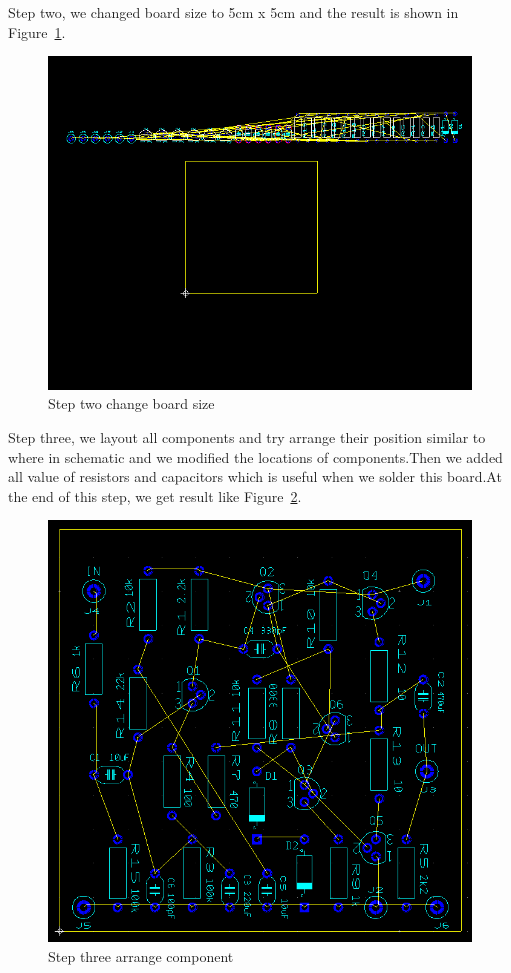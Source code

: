 Step two, we changed board size to 5cm x 5cm and the result is shown in Figure~\ref{fig:Step two change board size}.
\begin{figure}[htbp]
	\centering
	\includegraphics[scale=0.6]{"../Photo/Chap6/step_two_change_board_size"}
	\caption{Step two change board size}
	\label{fig:Step two change board size}
\end{figure}

Step three, we layout all components and try arrange their position similar to where in schematic and we modified the locations of components.Then we added all value of resistors and capacitors which is useful when we solder this board.At the end of this step, we get result like Figure~\ref{fig:Step three arrange component}.
\begin{figure}[htbp]
	\centering
	\includegraphics[scale=0.6]{"../Photo/Chap6/step_sthree_arrange_components"}
	\caption{Step three arrange component}
	\label{fig:Step three arrange component}
\end{figure}


